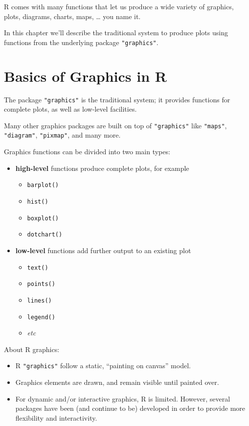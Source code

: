 \documentclass[
]{book}
\providecommand{\tightlist}{%
  \setlength{\itemsep}{0pt}\setlength{\parskip}{0pt}}
\begin{document}
R comes with many functions that let us produce a wide variety of graphics,
plots, diagrams, charts, maps, \ldots{} you name it.

In this chapter we'll describe the traditional system to produce plots using
functions from the underlying package \texttt{"graphics"}.

\hypertarget{basics-of-graphics-in-r}{%
\section{Basics of Graphics in R}\label{basics-of-graphics-in-r}}

The package \texttt{"graphics"} is the traditional system; it provides functions for
complete plots, as well as low-level facilities.

Many other graphics packages are built on top of \texttt{"graphics"} like \texttt{"maps"},
\texttt{"diagram"}, \texttt{"pixmap"}, and many more.

Graphics functions can be divided into two main types:

\begin{itemize}
\item
  \textbf{high-level} functions produce complete plots, for example

  \begin{itemize}
  \tightlist
  \item
    \texttt{barplot()}
  \item
    \texttt{hist()}
  \item
    \texttt{boxplot()}
  \item
    \texttt{dotchart()}
  \end{itemize}
\item
  \textbf{low-level} functions add further output to an existing plot

  \begin{itemize}
  \tightlist
  \item
    \texttt{text()}
  \item
    \texttt{points()}
  \item
    \texttt{lines()}
  \item
    \texttt{legend()}
  \item
    \emph{etc}
  \end{itemize}
\end{itemize}

About R graphics:

\begin{itemize}
\item
  R \texttt{"graphics"} follow a static, ``painting on canvas'' model.
\item
  Graphics elements are drawn, and remain visible until painted over.
\item
  For dynamic and/or interactive graphics, R is limited. However, several
  packages have been (and continue to be) developed in order to provide more
  flexibility and interactivity.
\end{itemize}
\end{document}
